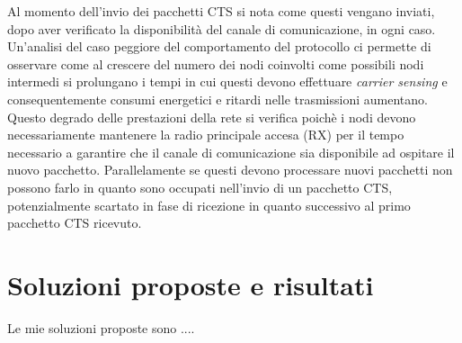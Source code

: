 \documentclass{report}
\begin{document}
Al momento dell'invio dei pacchetti CTS si nota come questi vengano inviati, dopo aver verificato la disponibilità del canale di comunicazione,
in ogni caso. Un'analisi del caso peggiore del comportamento del protocollo ci permette di osservare come al crescere del numero dei nodi coinvolti
come possibili nodi intermedi si prolungano i tempi in cui questi devono effettuare \emph{carrier sensing} e consequentemente consumi energetici
e ritardi nelle trasmissioni aumentano. Questo degrado delle prestazioni della rete si verifica poichè i nodi devono necessariamente mantenere
la radio principale accesa (RX) per il tempo necessario a garantire che il canale di comunicazione sia disponibile ad ospitare il nuovo pacchetto.
Parallelamente se questi devono processare nuovi pacchetti non possono farlo in quanto sono occupati nell'invio di un pacchetto CTS,
potenzialmente scartato in fase di ricezione in quanto successivo al primo pacchetto CTS ricevuto.

\section{Soluzioni proposte e risultati}

Le mie soluzioni proposte sono ....

\end{document}
